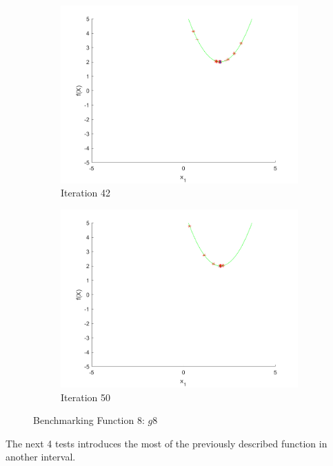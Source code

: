 \begin{figure}
\begin{subfigure}[b]{0.4\textwidth}
   \includegraphics[width=\textwidth]{img/smpl/circshft/loa-iter-42}
   \caption{Iteration 42}
   \label{fig:s3-iter-6}
 \end{subfigure}
 \begin{subfigure}[b]{0.4\textwidth}
   \includegraphics[width=\textwidth]{img/smpl/circshft/loa-iter-50}
   \caption{Iteration 50}
   \label{fig:s3-iter-7}
 \end{subfigure}
 \caption{Benchmarking Function 8: $g8$}
\end{figure}

\clearpage

\par The next 4 tests introduces the most of the previously described function in another interval.


